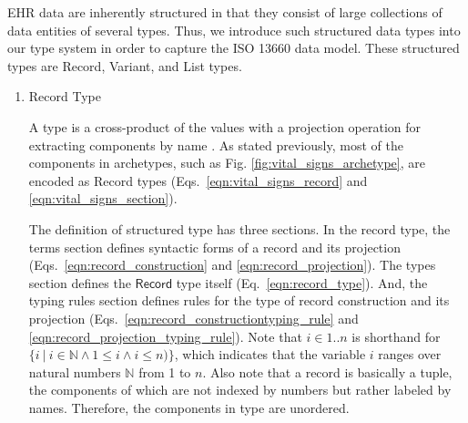 \documentclass[preprint,3p,onecolumn,times,review]{article}
\begin{document}
{EHR data are inherently structured in that they consist of large collections of data entities of several types.
Thus, we introduce such structured data types into our type system in order to capture the ISO 13660 data model.
These structured types are Record, Variant, and List types.
  
\begin{enumerate}
\item Record Type

  A {} type is a cross-product of the values with a projection operation for extracting components by name \cite[p.18]{cardelli04:_type_system,pierce02:_types_progr_languag}.
  As stated previously, most of the components in archetypes, such as Fig. \ref{fig:vital_signs_archetype}, are encoded as {\sf Record} types (Eqs.~\ref{eqn:vital_signs_record} and \ref{eqn:vital_signs_section}).

  The definition of structured type has three sections. In the record type, the terms section defines syntactic forms of a record and its projection (Eqs.~\ref{eqn:record_construction} and \ref{eqn:record_projection}). The types section defines the $\mathsf{Record}$ type itself (Eq.~\ref{eqn:record_type}). And, the typing rules section defines rules for the type of record construction and its projection (Eqs.~\ref{eqn:record_constructiontyping_rule} and \ref{eqn:record_projection_typing_rule}). Note that $i \in 1..n$ is shorthand for $\{ i~|~ i  \in \mathbb{N} \wedge 1 \leq i \wedge i \leq n )\}$, which indicates that the variable $i$ ranges over natural numbers $\mathbb{N}$ from 1 to $n$.
Also note that a record is basically a tuple, the components of which are not indexed by numbers but rather labeled by names. Therefore, the components in {} type are unordered.


\end{enumerate}}
\end{document}
